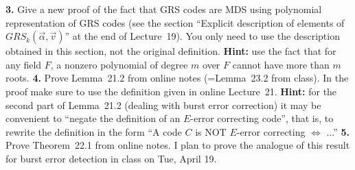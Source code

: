 \documentclass[12pt]{amsart}
\begin{document}
\skv
{\bf 3.} Give a new proof of the fact that GRS codes are MDS using polynomial representation of GRS codes (see the section
``Explicit description of elements of $GRS_k(\vec{\alpha}, \vec{v})$'' at the end of Lecture~19). You only need to use the description obtained in this section, not the original definition. {\bf Hint:} use the fact that for any field $F$, a nonzero polynomial of degree $m$ over $F$ cannot have more than $m$ roots.
\skv
{\bf 4.} Prove Lemma~21.2 from online notes (=Lemma~23.2 from class). In the proof make sure to use the definition given in online Lecture~21. {\bf Hint:} for the second part of Lemma~21.2 (dealing with burst error correction) it may be convenient to ``negate the definition of an
$E$-error correcting code'', that is, to rewrite the definition in the form ``A code $C$ is NOT $E$-error correcting $\iff$ ...''
\skv
{\bf 5.} Prove Theorem~22.1 from online notes. I plan to prove the analogue of this result for burst error detection in class on Tue, April 19. 
\end{document}
